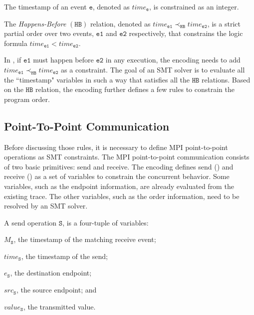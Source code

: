 \begin{definition}[Timestamp]\label{def:order}
The timestamp of an event $\mathtt{e}$, denoted as $\mathit{time}_\mathtt{e}$, is constrained as an integer.
\end{definition}

\begin{definition}\label{def:happens-before}
The \emph{Happens-Before} $(\mathtt{HB})$ relation, denoted as
$\mathit{time}_\mathtt{e1} \mathrm{\prec_\mathtt{HB}} \mathit{time}_\mathtt{e2}$, is a strict partial order over two events, $\mathtt{e1}$ and $\mathtt{e2}$ respectively, that constrains the logic formula $\mathit{time}_\mathtt{e1} <  \mathit{time}_\mathtt{e2}$. 
\label{def:hb}
\end{definition}

In , if $\mathtt{e1}$ must happen before $\mathtt{e2}$ in any execution, the encoding needs to add $\mathit{time}_\mathtt{e1} \mathrm{\prec_\mathtt{HB}} \mathit{time}_\mathtt{e2}$ as a constraint. The goal of an SMT solver is to evaluate all the ``timestamp" variables in such a way that satisfies all the $\mathtt{HB}$ relations. Based on the $\mathtt{HB}$ relation, the encoding further defines a few rules to constrain the program order. 

\subsection{Point-To-Point Communication}
Before discussing those rules, it is necessary to define MPI point-to-point operations as SMT constraints. The MPI point-to-point communication consists of two basic  primitives: send and receive. The encoding defines send () and receive () as a set of variables to constrain the concurrent behavior. Some variables, such as the endpoint information, are already evaluated from the existing trace. The other variables, such as the order information, need to be resolved by an SMT solver. 
 
\begin{definition}[Send] \label{def:snd}
A send operation $\mathtt{S}$, is a four-tuple of variables:
\begin{compactenum}
\item $M_\mathtt{S}$, the timestamp of the matching receive event;
\item $\mathit{time}_\mathtt{S}$, the timestamp of the send;
\item $e_\mathtt{S}$, the destination endpoint; 
\item $src_\mathtt{S}$, the source endpoint; and
\item $\mathit{value}_\mathtt{S}$, the transmitted value.
\end{compactenum}
\end{definition}

